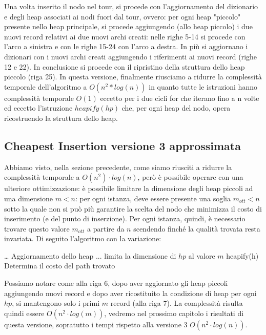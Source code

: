 \documentclass[a4paper,12pt]{report}
\begin{document}
Una volta inserito il nodo nel tour, si procede con l'aggiornamento del dizionario e degli heap associati ai nodi fuori dal tour, ovvero: per ogni heap "piccolo" presente nello heap principale, si procede aggiungendo (allo heap piccolo) i due nuovi record relativi ai due nuovi archi creati: nelle righe 5-14 si procede con l'arco a sinistra e con le righe 15-24 con l'arco a destra. In più si aggiornano i dizionari con i nuovi archi creati aggiungendo i riferimenti ai nuovi record (righe 12 e 22).
In conclusione si procede con il ripristino della struttura dello heap piccolo (riga 25). \newline In questa versione, finalmente riusciamo a ridurre la complessità temporale dell'algoritmo a $O(n^2 * log(n))$ in quanto tutte le istruzioni hanno complessità temporale $O(1)$ eccetto per i due cicli for che iterano fino a n volte ed eccetto l'istruzione $heapify(hp)$ che, per ogni heap del nodo, opera ricostruendo la struttura dello heap.

\subsection{Cheapest Insertion versione 3 approssimata}
Abbiamo visto, nella sezione precedente, come siamo riusciti a ridurre la complessità temporale a $O(n^2) \cdot log(n)$, però è possibile operare con una ulteriore ottimizzazione: è possibile limitare la dimensione degli heap piccoli ad una dimensione $m < n$: per ogni istanza, deve essere presente una soglia $m_{ott} < n$ sotto la quale non si può più garantire la scelta del nodo che minimizza il costo di inserimento (e del punto di inserzione). Per ogni istanza, quindi, è necessario trovare questo valore $m_{ott}$ a partire da $n$ scendendo finché la qualità trovata resta invariata. Di seguito l'algoritmo con la variazione:
\begin{tcolorbox}[colframe=black, colback=white, boxrule=0.5pt, title=Cheapest Insertion Versione 3 Approssimata, coltitle=black, fonttitle=\bfseries, colbacktitle=white, breakable]
  \begin{algorithmic}[1]
      \State \dots
        \State Aggiornamento dello heap ...
      \EndFor
        \State limita la dimensione di $hp$ al valore $m$
      \EndFor
      \State heapify(h)
    \EndWhile
    \State Determina il costo del path trovato
  \end{algorithmic}
\end{tcolorbox}
Possiamo notare come alla riga 6, dopo aver aggiornato gli heap piccoli aggiungendo nuovi record e dopo aver ricostituito la condizione di heap per ogni $hp$, si mantengono solo i primi $m$ record (alla riga 7). La complessità risulta quindi essere $O(n^2 \cdot log(m))$, vedremo nel prossimo capitolo i risultati di questa versione, sopratutto i tempi rispetto alla versione 3 $O(n^2 \cdot log(n))$.
\end{document}
